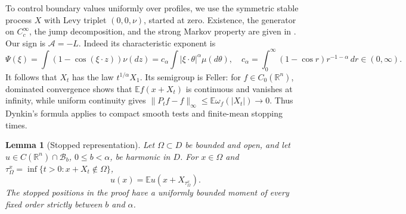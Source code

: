 \documentclass[11pt]{article}
\newtheorem{lemma}[theorem]{Lemma}
\numberwithin{equation}{section}
\newcommand{\R}{\mathbb R}
\newcommand{\E}{\mathbb E}
\newcommand{\Bcal}{\mathcal B}
\begin{document}
To control boundary values uniformly over profiles, we use the symmetric
stable process \(X\) with Levy triplet \((0,0,\nu)\), started at zero.
Existence, the generator on \(C_c^\infty\), the jump decomposition, and the
strong Markov property are given in
\cite[Results 7.5, 6.8, 9.7--9.12, and 4.12]{S}.
Our sign is \(\mathcal A=-L\). Indeed its characteristic exponent is
\[
 \Psi(\xi)=\int(1-\cos(\xi\cdot z))\nu(dz)
 =c_\alpha\int|\xi\cdot\theta|^\alpha\mu(d\theta),
 \quad c_\alpha=\int_0^\infty(1-\cos r)r^{-1-\alpha}\,dr\in(0,\infty).
\]
It follows that \(X_t\) has the law \(t^{1/\alpha}X_1\).
Its semigroup is Feller: for \(f\in C_0(\R^n)\), dominated convergence
shows that \(\E f(x+X_t)\) is continuous and vanishes at infinity, while
uniform continuity gives
\(\|P_tf-f\|_\infty\le\E\omega_f(|X_t|)\to0\).
Thus Dynkin's formula \cite[Lemma 12.2]{S} applies to compact smooth tests
and finite-mean stopping times.

\begin{lemma}[Stopped representation]\label{lem:stopped}
Let \(\Omega\subset D\) be bounded and open, and let
\(u\in C(\R^n)\cap\Bcal_b\), \(0\le b<\alpha\), be harmonic in \(D\).
For \(x\in\Omega\) and
\(\tau_\Omega^x=\inf\{t>0:x+X_t\notin\Omega\}\),
\begin{equation}\label{eq:stopped}
 u(x)=\E u(x+X_{\tau_\Omega^x}).
\end{equation}
The stopped positions in the proof have a uniformly bounded moment of every
fixed order strictly between \(b\) and \(\alpha\).
\end{lemma}
\end{document}
